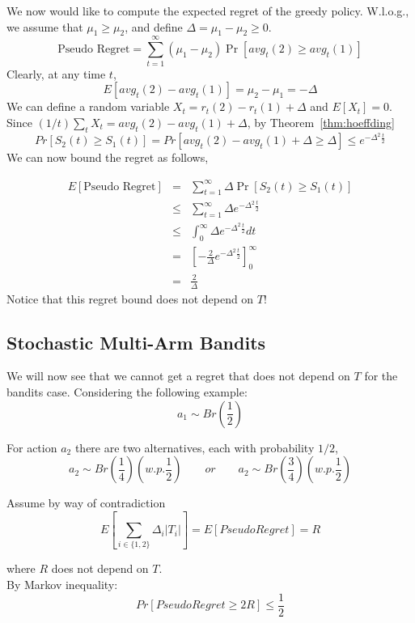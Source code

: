 We now would like to compute the expected regret of the greedy
policy. W.l.o.g., we assume that $\mu_{1}\ge\mu_{2}$, and define
$\Delta=\mu_{1}-\mu_{2}\ge0$.
\[
\text{Pseudo Regret}= \sum_{t=1}^{\infty}(\mu_{1}-\mu_{2})
\Pr\left[avg_{t}(2)\ge avg_{t}(1)\right]
\]
Clearly, at any time $t$,
\[
E[avg_{t}(2)-avg_{t}(1)]=\mu_{2}-\mu_{1}=-\Delta
\]
We can define a random variable $X_t=r_t(2)-r_t(1)+\Delta$ and
$E[X_t]=0$. Since $(1/t)\sum_t X_t = avg_t(2)- avg_t(1)+\Delta$, by
Theorem~\ref{thm:hoeffding}
\[
Pr[S_2(t)\geq S_1(t)]= Pr\left[avg_{t}(2)-avg_{t}(1)+\Delta
\ge\Delta\right]\le e^{-\Delta^{2}\frac{t}{2}}
\]
We can now bound the regret as follows,

\begin{align*}
E\left[\text{Pseudo Regret}\right] & = &
 \sum_{t=1}^{\infty}\Delta\Pr\left[S_{2}(t)\ge S_{1}(t)\right]\\
 & \le &  \sum_{t=1}^{\infty}\Delta e^{-\Delta^{2}\frac{t}{2}}\\
 & \le &  \int_{0}^{\infty}\Delta e^{-\Delta^{2}\frac{t}{2}}dt\\
 & = & \left[-\frac{2}{\Delta}e^{-\Delta^{2}\frac{t}{2}}\right]_{0}^{\infty}\\
 & = & \frac{2}{\Delta}
\end{align*}
Notice that this regret bound does not depend on $T$!

\subsection{Stochastic Multi-Arm Bandits}


We will now see that we cannot get a regret that does not depend on
$T$ for the bandits case. Considering the following example:
\[
a_{1}\sim Br\left(\frac{1}{2}\right)\]

For action $a_2$ there are two alternatives, each with probability
$1/2$,
\[
a_{2}\sim Br\left(\frac{1}{4}\right) \left(w.p. \frac{1}{2}\right)
\qquad or \qquad a_{2}\sim Br\left(\frac{3}{4}\right) \left(w.p.
\frac{1}{2}\right)
\]

Assume by way of contradiction
\[
E\left[ \sum_{i \in \{1,2\}} \Delta_i |T_i|\right] = E\left[Pseudo
Regret\right]=R
\]

where $R$ does not depend on $T$. \\ By Markov inequality:
\[
Pr\left[Pseudo Regret\ge2R\right]\le\frac{1}{2}
\]

